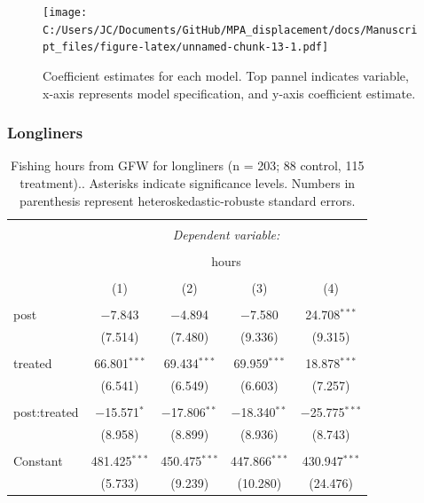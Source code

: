 \documentclass[]{article}
\begin{document}
\begin{figure}
\centering
\texttt{[image: C:/Users/JC/Documents/GitHub/MPA\_displacement/docs/Manuscript\_files/figure-latex/unnamed-chunk-13-1.pdf]}
\caption{\label{fig:unnamed-chunk-13}\label{fig:puse}Coefficient estimates
for each model. Top pannel indicates variable, x-axis represents model
specification, and y-axis coefficient estimate.}
\end{figure}

\clearpage

\subsubsection{Longliners}\label{longliners}

\begin{table}[!htbp] \centering 
  \caption{\label{tab:long}Fishing hours from GFW for longliners (n = 203; 88 control, 115 treatment).. Asterisks indicate significance levels. Numbers in parenthesis represent heteroskedastic-robuste standard errors.} 
  \label{} 
\begin{tabular}{@{\extracolsep{5pt}}lcccc} 
\\[-1.8ex]\hline 
\hline \\[-1.8ex] 
 & \multicolumn{4}{c}{\textit{Dependent variable:}} \\ 
\cline{2-5} 
\\[-1.8ex] & \multicolumn{4}{c}{hours} \\ 
\\[-1.8ex] & (1) & (2) & (3) & (4)\\ 
\hline \\[-1.8ex] 
 post & $-$7.843 & $-$4.894 & $-$7.580 & 24.708$^{***}$ \\ 
  & (7.514) & (7.480) & (9.336) & (9.315) \\ 
  & & & & \\ 
 treated & 66.801$^{***}$ & 69.434$^{***}$ & 69.959$^{***}$ & 18.878$^{***}$ \\ 
  & (6.541) & (6.549) & (6.603) & (7.257) \\ 
  & & & & \\ 
 post:treated & $-$15.571$^{*}$ & $-$17.806$^{**}$ & $-$18.340$^{**}$ & $-$25.775$^{***}$ \\ 
  & (8.958) & (8.899) & (8.936) & (8.743) \\ 
  & & & & \\ 
 Constant & 481.425$^{***}$ & 450.475$^{***}$ & 447.866$^{***}$ & 430.947$^{***}$ \\ 
  & (5.733) & (9.239) & (10.280) & (24.476) \\ 

\end{tabular}
\end{table}
\end{document}
